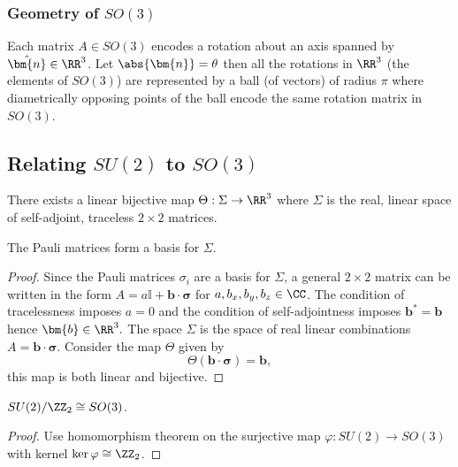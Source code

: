 \documentclass[12pt, a4paper]{article}
\begin{document}
\subsubsection{Geometry of \texorpdfstring{\(SO(3)\)}{TEXT}}

Each matrix \(A \in SO(3)\) encodes a rotation about an axis spanned by \(\hat{\bm{n}} \in \RR^3\). Let \(\abs{\bm{n}}=\theta\) then all the rotations in \(\RR^3\) (the elements of \(SO(3)\)) are represented by a ball (of vectors) of radius \(\pi\) where diametrically opposing points of the ball encode the same rotation matrix in \(SO(3)\).


\subsection{Relating \texorpdfstring{\(SU(2)\)}{TEXT} to \texorpdfstring{\(SO(3)\)}{TEXT}}

\begin{proposition}
    There exists a linear bijective map \(\Theta :\Sigma \to \RR^3\) where \(\Sigma\) is the real, linear space of self-adjoint, traceless \(2\times 2\) matrices.
\end{proposition}

\begin{mdnote}
    The Pauli matrices form a basis for \(\Sigma\).
\end{mdnote}

\begin{proof}
    Since the Pauli matrices \(\sigma_i\) are a basis for \(\Sigma\), a general \(2 \times 2\) matrix can be written in the form \(A=a\mathbb{I}+\bm{b} \cdot \bm{\sigma}\) for \(a,b_x,b_y,b_z \in \CC\). The condition of tracelessness imposes \(a=0\) and the condition of self-adjointness imposes \(\bm{b}^*=\bm{b}\) hence \(\bm{b}\in \RR^3.\) The space \(\Sigma\) is the space of real linear combinations \(A=\bm{b} \cdot \bm{\sigma}\). Consider the map \(\Theta\) given by
    \[\Theta(\bm{b} \cdot \bm{\sigma})=\bm{b},\]
    this map is both linear and bijective.
\end{proof}

\begin{mdthm}
    \(SU(2) / \ZZ_2 \cong SO(3)\).
\end{mdthm}

\begin{proof}
    Use homomorphism theorem on the surjective map \(\varphi:SU(2) \to SO(3)\) with kernel \(\ker \varphi \cong \ZZ_2\).
\end{proof}
\end{document}
